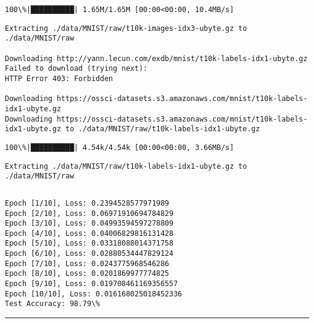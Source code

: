 \documentclass[11pt]{article}
\begin{document}
    \begin{Verbatim}[commandchars=\\\{\}]
100\%|██████████| 1.65M/1.65M [00:00<00:00, 10.4MB/s]
    \end{Verbatim}

    \begin{Verbatim}[commandchars=\\\{\}]
Extracting ./data/MNIST/raw/t10k-images-idx3-ubyte.gz to ./data/MNIST/raw

Downloading http://yann.lecun.com/exdb/mnist/t10k-labels-idx1-ubyte.gz
Failed to download (trying next):
HTTP Error 403: Forbidden

Downloading https://ossci-datasets.s3.amazonaws.com/mnist/t10k-labels-
idx1-ubyte.gz
Downloading https://ossci-datasets.s3.amazonaws.com/mnist/t10k-labels-
idx1-ubyte.gz to ./data/MNIST/raw/t10k-labels-idx1-ubyte.gz
    \end{Verbatim}

    \begin{Verbatim}[commandchars=\\\{\}]
100\%|██████████| 4.54k/4.54k [00:00<00:00, 3.66MB/s]
    \end{Verbatim}

    \begin{Verbatim}[commandchars=\\\{\}]
Extracting ./data/MNIST/raw/t10k-labels-idx1-ubyte.gz to ./data/MNIST/raw

    \end{Verbatim}

    \begin{Verbatim}[commandchars=\\\{\}]

    \end{Verbatim}

    \begin{Verbatim}[commandchars=\\\{\}]
Epoch [1/10], Loss: 0.2394528577971989
Epoch [2/10], Loss: 0.06971910694784829
Epoch [3/10], Loss: 0.04993594597278809
Epoch [4/10], Loss: 0.04006829816131428
Epoch [5/10], Loss: 0.03318088014371758
Epoch [6/10], Loss: 0.02880534447829124
Epoch [7/10], Loss: 0.0243775968546286
Epoch [8/10], Loss: 0.0201869977774825
Epoch [9/10], Loss: 0.019708461169356557
Epoch [10/10], Loss: 0.016168025018452336
Test Accuracy: 98.79\%
    \end{Verbatim}

    \begin{center}\rule{0.5\linewidth}{0.5pt}\end{center}
\end{document}
